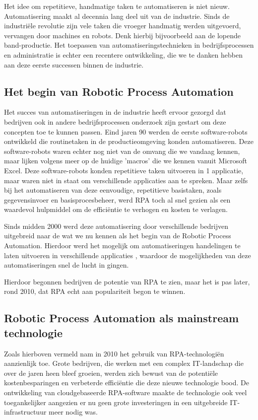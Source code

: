 Het idee om repetitieve, handmatige taken te automatiseren is niet nieuw.
Automatisering maakt al decennia lang deel uit van de industrie. Sinds de industriële revolutie zijn vele taken die vroeger handmatig werden uitgevoerd, vervangen door machines en robots. Denk hierbij bijvoorbeeld aan de lopende band-productie. Het toepassen van automatiseringstechnieken in bedrijfsprocessen en administratie is echter een recentere ontwikkeling, die we te danken hebben aan deze eerste successen binnen de industrie.

\subsection{Het begin van Robotic Process Automation}

Het succes van automatiseringen in de industrie heeft ervoor gezorgd dat bedrijven ook in andere bedrijfsprocessen onderzoek zijn gestart om deze concepten toe te kunnen passen. Eind jaren 90 werden de eerste software-robots ontwikkeld die routinetaken in de productieomgeving konden automatiseren. Deze software-robots waren echter nog niet van de omvang die we vandaag kennen, maar lijken volgens \textcite{ZalewskaTurzynska2022} meer op de huidige 'macros' die we kennen vanuit Microsoft Excel. Deze software-robots konden repetitieve taken uitvoeren in 1 applicatie, maar waren niet in staat om verschillende applicaties aan te spreken. Maar zelfs bij het automatiseren van deze eenvoudige, repetitieve basistaken, zoals gegevensinvoer en basisprocesbeheer, werd RPA toch al snel gezien als een waardevol hulpmiddel om de efficiëntie te verhogen en kosten te verlagen.

Sinds midden 2000 werd deze automatisering door verschillende bedrijven uitgebreid naar de wat we nu kennen als het begin van de Robotic Process Automation. Hierdoor werd het mogelijk om automatiseringen handelingen te laten uitvoeren in verschillende applicaties \autocite{Fluss2020}, waardoor de mogelijkheden van deze automatiseringen snel de lucht in gingen.

Hierdoor begonnen bedrijven de potentie van RPA te zien, maar het is pas later, rond 2010, dat RPA echt aan populariteit begon te winnen.

\subsection{Robotic Process Automation als mainstream technologie}

Zoals hierboven vermeld nam in 2010 het gebruik van RPA-technologiën aanzienlijk toe. Grote bedrijven, die werken met een complex IT-landschap die over de jaren heen bleef groeien, werden zich bewust van de potentiële kostenbesparingen en verbeterde efficiëntie die deze nieuwe technologie bood. De ontwikkeling van cloudgebaseerde RPA-software maakte de technologie ook veel toegankelijker aangezien er nu geen grote investeringen in een uitgebreide IT-infrastructuur meer nodig was.

